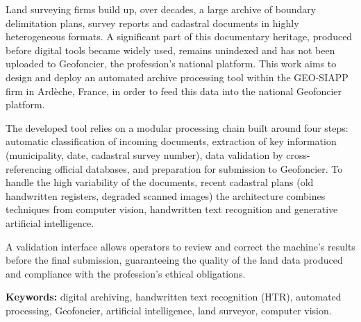 Land surveying firms build up, over decades, a large archive of boundary delimitation plans, survey reports and cadastral documents in highly heterogeneous formats. A significant part of this documentary heritage, produced before digital tools became widely used, remains unindexed and has not been uploaded to Geofoncier, the profession's national platform. This work aims to design and deploy an automated archive processing tool within the GEO-SIAPP firm in Ardèche, France, in order to feed this data into the national Geofoncier platform.

The developed tool relies on a modular processing chain built around four steps: automatic classification of incoming documents, extraction of key information (municipality, date, cadastral survey number), data validation by cross-referencing official databases, and preparation for submission to Geofoncier. To handle the high variability of the documents, recent cadastral plans (old handwritten registers, degraded scanned images) the architecture combines techniques from computer vision, handwritten text recognition and generative artificial intelligence.

A validation interface allows operators to review and correct the machine's results before the final submission, guaranteeing the quality of the land data produced and compliance with the profession's ethical obligations.

\vspace{1.5em}
\noindent\textbf{Keywords:} digital archiving, handwritten text recognition (HTR), automated processing, Geofoncier, artificial intelligence, land surveyor, computer vision.
